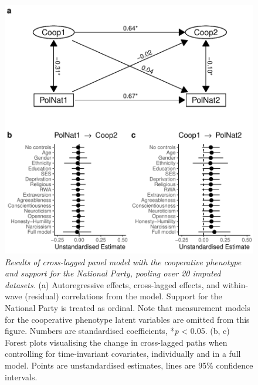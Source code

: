 \documentclass[
  man,floatsintext]{apa6}
\begin{document}
\begin{figure}
\centering
\includegraphics{manuscript_files/figure-latex/clpmPlotAPolNat-1.pdf}
\caption{\label{fig:clpmPlotAPolNat}\emph{Results of cross-lagged panel model with the
cooperative phenotype and support for the National Party, pooling over 20
imputed datasets.} (a) Autoregressive effects, cross-lagged effects, and
within-wave (residual) correlations from the model. Support for the National
Party is treated as ordinal. Note that measurement models for the cooperative
phenotype latent variables are omitted from this figure. Numbers are
standardised coefficients, *\emph{p} \textless{} 0.05. (b, c) Forest plots visualising the
change in cross-lagged paths when controlling for time-invariant covariates,
individually and in a full model. Points are unstandardised estimates, lines are
95\% confidence intervals.}
\end{figure}

\newpage
\end{document}
